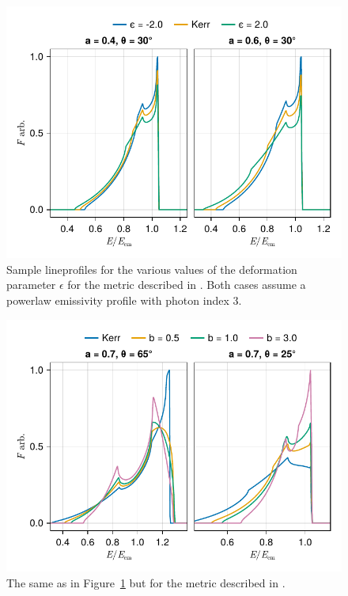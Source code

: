 \documentclass[fleqn,usenatbib]{mnras}
\begin{document}
\begin{figure}
    \centering
    \includegraphics[width=0.99\columnwidth]{figures/lineprofiles.johannsen-comparison.pdf}
    \caption{Sample lineprofiles for the various values of the deformation
    parameter $\epsilon$ for the metric described in
    \citet{johannsen_testing_2013}. Both cases assume a powerlaw emissivity profile
    with photon index $3$.}
    \label{fig:reflection-johannsen}
\end{figure}

\begin{figure}
    \centering
    \includegraphics[width=0.99\columnwidth]{figures/lineprofile.emda.pdf}
    \caption{The same as in Figure~\ref{fig:reflection-johannsen} but for the
    metric described in \citet{garcia_class_1995}.}
    \label{fig:reflection-emda}
\end{figure}
\end{document}
